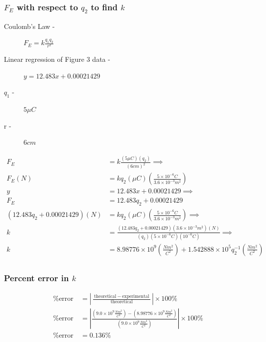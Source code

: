 \documentclass{article}
\begin{document}
\subsubsection{$F_{E}$ with respect to $q_2$ to find $k$}%
\label{ssub:_f__e_with_respect_to_q_2_to_find_k_}


\begin{description}
	\item[Coulomb's Law -]
		$F_{E} = k \frac{q_1 q_2}{r^2}$
	\item[Linear regression of Figure 3 data -] $y = 12.483 x + 0.00021429$
	\item[$q_1$ -] $5 \mu C$
		\item[r -] $6 cm$
\end{description}

\begin{align*}
	F_{E} &= k \frac{(5 \mu C)(q_2)}{(6cm)^2} \implies \\
	F_{E}(N) &=  k q_2(\mu C) \left( \frac{5\times 10^{-6}C}{3.6 \times 10^{-3}m^2} \right)  \\
	y &= 12.483 x + 0.00021429 \implies \\
	F_{E} &= 12.483 q_2 + 0.00021429 \\
	(12.483 q_2 + 0.00021429) (N) &=  k q_2(\mu C) \left( \frac{5\times 10^{-6}C}{3.6 \times 10^{-3}m^2} \right) \implies \\
	k &= \frac{ (12.483 q_2 + 0.00021429)(3.6\times 10^{-3} m^2)(N)}{(q_2)(5\times 10^{-6}C)(10^{-6}C)} \implies  \\
	k &=  \boxed{ 8.98776 \times 10^{9} \left( \frac{Nm^2}{C^2} \right)}  + 1.542888 \times 10^{5}q_2^{-1}\left( \frac{Nm^2}{C^2} \right) \\
\end{align*}


\subsubsection{Percent error in $k$}%
\label{ssub:percentag}

\begin{align*}
	\:\text{\% error}\: &= \left| \frac{\:\text{theoretical}\: - \:\text{experimental}\:}{\:\text{theoretical}\:}  \right| \times 100\%\\
\:\text{\% error}\: &= \left|   \frac{\left( 9.0 \times 10^{9} \frac{N m^2}{C^2} \right) - \left( 8.98776 \times 10^{9}\frac{N m^2}{C^2}  \right) }{\left( 9.0 \times 10^{9} \frac{N m^2}{C^2} \right)} \right| \times 100\%\\
\:\text{\% error}\: &= 0.136 \%
\end{align*}
\end{document}
